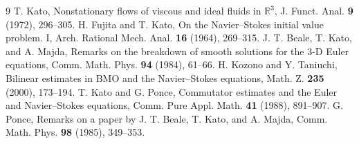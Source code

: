 \documentclass[11pt,a4paper]{article}
\begin{document}
\begin{thebibliography}{9}
 T. Kato, Nonstationary flows of viscous and ideal fluids in \(\mathbb{R}^3\), J. Funct. Anal. \textbf{9} (1972), 296--305.
 H. Fujita and T. Kato, On the Navier--Stokes initial value problem. I, Arch. Rational Mech. Anal. \textbf{16} (1964), 269--315.
 J. T. Beale, T. Kato, and A. Majda, Remarks on the breakdown of smooth solutions for the 3-D Euler equations, Comm. Math. Phys. \textbf{94} (1984), 61--66.
 H. Kozono and Y. Taniuchi, Bilinear estimates in BMO and the Navier--Stokes equations, Math. Z. \textbf{235} (2000), 173--194.
 T. Kato and G. Ponce, Commutator estimates and the Euler and Navier--Stokes equations, Comm. Pure Appl. Math. \textbf{41} (1988), 891--907.
 G. Ponce, Remarks on a paper by J. T. Beale, T. Kato, and A. Majda, Comm. Math. Phys. \textbf{98} (1985), 349--353.
\end{thebibliography}
\end{document}
